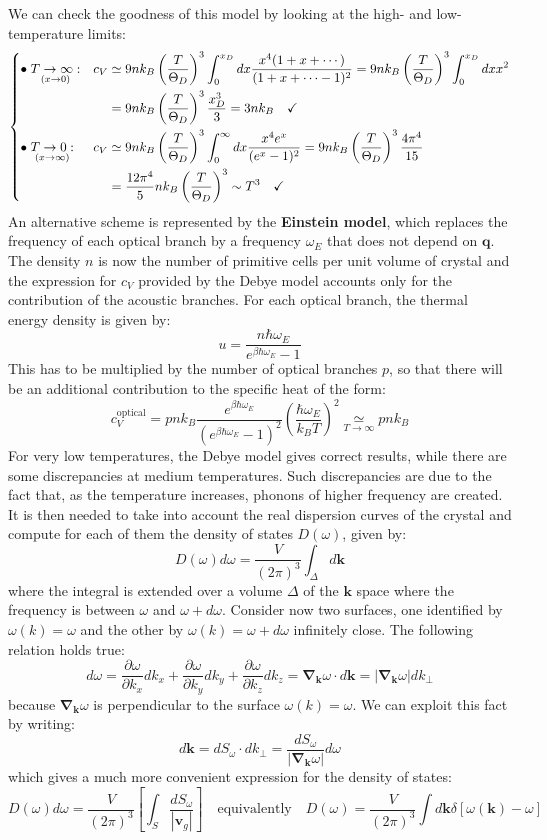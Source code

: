\documentclass[10.75pt,a4paper,openright,bottom=2cm]{article}
\renewcommand{\Vec}[1]{\boldsymbol{#1}}
\begin{document}
We can check the goodness of this model by looking at the high- and low-temperature limits:
\[
\left\{
\begin{aligned}
&\bullet\underset{(x\to0)}{T\to\infty:}&&c_V\simeq9nk_B\left(\frac{T}{\Theta_D}\right)^3\int_0^{x_D}dx\frac{x^4(1+x+\cdots)}{(1+x+\cdots-1)^2}=9nk_B\left(\frac{T}{\Theta_D}\right)^3\int_0^{x_D}dxx^2\\
& &&{\color{white}{c_V}}=9nk_B\left(\frac{T}{\Theta_D}\right)^3\frac{x_D^3}{3}=3nk_B \quad \checkmark\\
&\bullet\underset{(x\to\infty)}{T\to0:}&&c_V\simeq9nk_B\left(\frac{T}{\Theta_D}\right)^3\int_0^\infty dx\frac{x^4e^x}{(e^x-1)^2}=9nk_B\left(\frac{T}{\Theta_D}\right)^3\frac{4\pi^4}{15}\\
& &&{\color{white}{c_V}}=\frac{12\pi^4}{5}nk_B\left(\frac{T}{\Theta_D}\right)^3\sim T^3 \quad \checkmark
\end{aligned}
\right.
\]
An alternative scheme is represented by the \textbf{Einstein model}, which replaces the frequency of each optical branch by a frequency $\omega_E$ that does not depend on $\Vec{q}$. The density $n$ is now the number of primitive cells per unit volume of crystal and the expression for $c_V$ provided by the Debye model accounts only for the contribution of the acoustic branches. For each optical branch, the thermal energy density is given by:
\[
u=\frac{n\hbar\omega_E}{e^{\beta\hbar\omega_E}-1}
\]
This has to be multiplied by the number of optical branches $p$, so that there will be an additional contribution to the specific heat of the form:
\[
c_V^{\text{optical}}=pnk_B\frac{e^{\beta\hbar\omega_E}}{(e^{\beta\hbar\omega_E}-1)^2}\left(\frac{\hbar\omega_E}{k_BT}\right)^2\underset{T\to\infty}{\simeq}pnk_B
\]
For very low temperatures, the Debye model gives correct results, while there are some discrepancies at medium temperatures. Such discrepancies are due to the fact that, as the temperature increases, phonons of higher frequency are created. It is then needed to take into account the real dispersion curves of the crystal and compute for each of them the density of states $D(\omega)$, given by:
\[
D(\omega)d\omega=\frac{V}{(2\pi)^3}\int_\Delta d\Vec{k}
\]
where the integral is extended over a volume $\Delta$ of the $\Vec{k}$ space where the frequency is between $\omega$ and $\omega+d\omega$. Consider now two surfaces, one identified by $\omega(k)=\omega$ and the other by $\omega(k)=\omega+d\omega$ infinitely close. The following relation holds true:
\[
d\omega=\frac{\partial\omega}{\partial k_x}dk_x+\frac{\partial\omega}{\partial k_y}dk_y+\frac{\partial\omega}{\partial k_z}dk_z=\Vec{\nabla}_{\Vec{k}}\omega\cdot d\Vec{k}=|\Vec{\nabla}_{\Vec{k}}\omega|dk_\perp
\]
because $\Vec{\nabla}_{\Vec{k}}\omega$ is perpendicular to the surface $\omega(k)=\omega$. We can exploit this fact by writing: 
\[
d\Vec{k}=dS_\omega\cdot dk_\perp=\frac{dS_\omega}{|\Vec{\nabla}_{\Vec{k}}\omega|}d\omega
\]
which gives a much more convenient expression for the density of states:
\[
D(\omega)d\omega=\frac{V}{(2\pi)^3}\left[\int_S\frac{dS_\omega}{|\Vec{v}_g|}\right] \quad \text{equivalently} \quad D(\omega)=\frac{V}{(2\pi)^3}\int d\Vec{k}\delta[\omega(\Vec{k})-\omega]
\]
\end{document}
